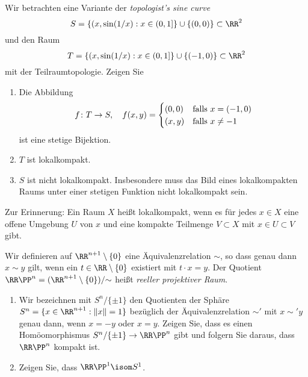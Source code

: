 

\setcounter{Sheet}{5}



\maketitle
\begin{exercise}
Wir betrachten eine Variante der \emph{topologist's sine curve}
\[
S = \{(x,\sin(1/x) : x\in (0,1]\}\cup \{(0,0)\} \subset \RR^2
\]
und den Raum
\[
T = \{(x,\sin(1/x) : x\in (0,1]\}\cup \{(-1,0)\} \subset \RR^2
\]
mit der Teilraumtopologie. Zeigen Sie
\begin{enumerate}
\item Die Abbildung
\[
f\colon T \to S,\quad f(x,y) = \begin{cases}
(0,0) & \textnormal{falls $x=(-1,0)$} \\
(x,y) & \textnormal{falls $x\neq -1$}
\end{cases}
\]
ist eine stetige Bijektion.
\item $T$ ist lokalkompakt.
\item $S$ ist nicht lokalkompakt. {\footnotesize Insbesondere muss das Bild eines lokalkompakten Raums unter einer stetigen Funktion nicht lokalkompakt sein.}
\end{enumerate}
{\footnotesize Zur Erinnerung: Ein Raum $X$ heißt lokalkompakt, wenn es für jedes $x\in X$ eine offene Umgebung $U$ von $x$ und eine kompakte Teilmenge $V\subset X$ mit $x\in U\subset V$ gibt.}
\end{exercise}

\begin{exercise}
Wir definieren auf $\RR^{n+1}\setminus\{0\}$ eine Äquivalenzrelation ${\sim}$, so dass genau dann $x\sim y$ gilt, wenn ein $t\in\RR\setminus\{0\}$ existiert mit $t\cdot x = y$. Der Quotient $\RR\PP^n = (\RR^{n+1}\setminus\{0\})/{\sim}$ heißt \emph{reeller projektiver Raum}.
\begin{enumerate}
\item Wir bezeichnen mit $S^n/\{\pm 1\}$ den Quotienten der Sphäre $S^n = \{x\in \RR^{n+1} : \|x\| =1\}$ bezüglich der Äquivalenzrelation $\sim'$ mit $x\sim' y$ genau dann, wenn $x = -y$ oder $x = y$. Zeigen Sie, dass es einen Homöomorphismus $S^n/\{\pm 1\} \to \RR\PP^{n}$ gibt und folgern Sie daraus, dass $\RR\PP^n$ kompakt ist.
\item Zeigen Sie, dass $\RR\PP^{1} \isom S^1$.
\end{enumerate}
\end{exercise}

